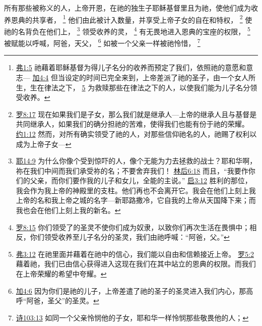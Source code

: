 \documentclass[12pt, a4paper, oneside]{ctexart}
\begin{document}
所有那些被称义的人，上帝开恩，在祂的独生子耶稣基督里且为祂，使他们成为收养恩典的共享者，
	\footnote {
		\href{https://biblehub.com/ephesians/1-5.htm}{弗1:5} 祂藉着耶稣基督为得儿子名分的收养而预定了我们，依照祂的意愿和意志---
		\href{https://biblehub.com/galatians/4-4.htm}{加4:4} 但当设定的时间已完全来到，上帝差派了祂的圣子，由一个女人所生，生在律法之下，
		\href{https://biblehub.com/galatians/4-5.htm}{5} 为救赎那些在律法之下的人，以使我们能为儿子名分领受收养。
	}
	他们由此被计入数量，并享受上帝子女的自在和特权，
	\footnote {
		\href{https://biblehub.com/romans/8-17.htm}{罗8:17} 现在如果我们是子女，那么我们就是继承人---上帝的继承人且与基督是共同继承人，如果我们的确分担祂的苦难，使得我们也能有份于祂的荣耀。
		\href{https://biblehub.com/john/1-12.htm}{约1:12} 然而，对所有确实领受了祂的人，对那些信仰祂名的人，祂赐了权利以成为上帝子女---
	}
	使祂的名背负在他们上，
	\footnote {
		\href{https://biblehub.com/jeremiah/14-9.htm}{耶14:9} 为什么你像个受到惊吓的人，像个无能为力去拯救的战士？耶和华啊，祢在我们中间而我们承受祢的名；不要舍弃我们！
		\href{https://biblehub.com/2_corinthians/6-18.htm}{林后6:18} 而且，“我要作你们的父亲，而你们要作我的儿子和女儿，全能的主说。”
		\href{https://biblehub.com/revelation/3-12.htm}{启3:12} 胜利的那位，我会作为我上帝的神殿里的支柱。他们再也不会离开它。我会在他们上刻上我上帝的名和我上帝之城的名字---新耶路撒冷，它自我的上帝从天国降下来；而我也会在他们上刻上我的新名。
	}
	领受收养的灵，
	\footnote {
		\href{https://biblehub.com/romans/8-15.htm}{罗8:15} 你们领受了的圣灵不使你们成为奴隶，以致你们再次生活在畏惧中；相反，你们领受收养至儿子名分的圣灵，我们由祂呼喊：“阿爸，父。”
	}
	有无畏地进入恩典的宝座的权限，
	\footnote {
		\href{https://biblehub.com/ephesians/3-12.htm}{弗3:12} 在祂里面并藉着在祂中的信心，我们能以自由和信赖接近上帝。
		\href{https://biblehub.com/romans/5-2.htm}{罗5:2} 藉着祂，我们已由信心获得进入这现在我们在其中站立的恩典的权限。而我们在上帝荣耀的希望中夸耀。
	}
	被赋能以呼喊，阿爸，天父，
	\footnote {
		\href{https://biblehub.com/galatians/4-6.htm}{加4:6} 因为你们是祂的儿子，上帝差遣了祂的圣子的圣灵进入我们内心，那高呼“阿爸，圣父”的圣灵。
	}
	如被一个父亲一样被祂怜惜，
	\footnote {
		\href{https://biblehub.com/psalms/103-13.htm}{诗103:13} 如同一个父亲怜悯他的子女，耶和华一样怜悯那些敬畏他的人；
	}
\end{document}
